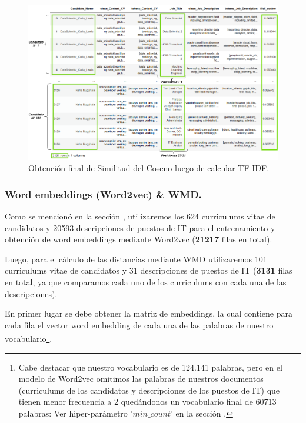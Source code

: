 \documentclass[12pt,a4paper]{article}
\begin{document}
\begin{sloppypar}
\begin{figure}[H] 
 \centering
 \includegraphics[width=1\textwidth]{images/implementacion_5/3_TF_IDF.png}
 \captionsetup{justification=centering,margin=2cm}
 \caption{Obtención final de Similitud del Coseno luego de calcular TF-IDF.} 
 \label{fig:3_TF_IDF}
\end{figure}

\subsubsection{Word embeddings (Word2vec) \& WMD.}\label{Implementacion_word_emb_y_wmd}

Como se mencionó en la sección \textit{}, utilizaremos los 624 curriculums vitae de candidatos y 20593 descripciones de puestos de IT para el entrenamiento y obtención de word embeddings mediante Word2vec (\textbf{21217} filas en total).

Luego, para el cálculo de las distancias mediante WMD utilizaremos 101 curriculums vitae de candidatos y 31 descripciones de puestos de IT (\textbf{3131} filas en total, ya que comparamos cada uno de los curriculums con cada una de las descripciones).

En primer lugar se debe obtener la matriz de embeddings, la cual contiene para cada fila el vector word embedding de cada una de las palabras de nuestro vocabulario\footnote{Cabe destacar que nuestro vocabulario es de 124.141 palabras, pero en el modelo de Word2vec omitimos las palabras de nuestros documentos (curriculums de los candidatos y descripciones de los puestos de IT) que tienen menor frecuencia a 2 quedándonos un vocabulario final de 60713 palabras: Ver hiper-parámetro '$min\_count$' en la sección \textit{}.}. 


\end{sloppypar}
\end{document}
